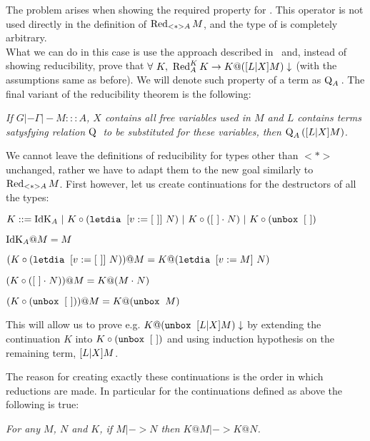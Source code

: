 The problem arises when showing the required property for . This operator is not used directly in the definition of $\Red{M}{<*>A}$, and the type of  is completely arbitrary.\\

What we can do in this case is use the approach described in~\cite{contextmabi} and, instead of showing reducibility, prove that $\forall\ K,\ \RedK{K}{A} -> \termin{K@(\substt{L}{X}{M})}$ (with the assumptions same as before). We will denote such property of a term as $\Q{}{A}$. The final variant of the reducibility theorem is the following:

\begin{introtheorem}\em
If $G |- \Gamma |- M ::: A$, $X$ contains all free variables used in $M$ and $L$ contains terms satysfying relation $\Q{}{}$ to be substituted for these variables, then
$\Q{(\substt{L}{X}{M})}{A}$.
\end{introtheorem}

We cannot leave the definitions of reducibility for types other than $<*>$ unchanged, rather we have to adapt them to the new goal similarly to $\Red{M}{<*>A}$. First however, let us create continuations for the destructors of all the types:
\begin{description}
\item $ K ::= \IdK{A} ~|~ K \circ (\letdia{v}{}{[~]}{N}) ~|~ K \circ (\appl{[~]}{N}) ~|~ K \circ (\unbox{[~]})$
\item $\IdK{A} @ M = M$
\item $ (K \circ (\letdia{v}{}{[~]}{N})) @ M = K @ (\letdia{v}{}{M}{N})$
\item $ (K \circ (\appl{[~]}{N})) @ M = K @ (\appl{M}{N})$
\item $ (K \circ (\unbox{[~]})) @ M = K @ (\unbox{M})$
\end{description}

This will allow us to prove e.g. $\termin{K@(\unbox{\substt{L}{X}{M}})}$ by extending the continuation $K$ into $K \circ (\unbox{[~]})$ and using induction hypothesis on the remaining term, $\substt{L}{X}{M}$.

The reason for creating exactly these continuations is the order in which reductions are made. In particular for the continuations defined as above the following is true:
\begin{propertyb}\em
For any $M$, $N$ and $K$, if $M |-> N$ then $K@M |-> K@N$.
\end{propertyb}

